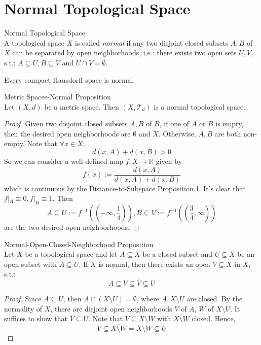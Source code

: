 \section{Normal Topological Space}

\begin{definition}{Normal Topological Space}\\
A topological space $X$ is called \textit{normal} if any two disjoint closed subsets $A,B$ of $X$ can be separated by open neighborhoods, i.e.: there exists two open sets $U,V$, s.t.: $A \subseteq U, B \subseteq V$ and $U \cap V =\emptyset$.
\end{definition}

\begin{proposition}
    Every compact Hausdorff space is normal.
\end{proposition}

\begin{proposition}{Metric Spaces-Normal Proposition}\\
Let $(X,d)$ be a metric space. Then $(X,\mathcal{T}_{d})$ is a normal topological space.
\end{proposition}

\begin{proof}
    Given two disjoint closed subsets $A,B$ of $B$, if one of $A$ or $B$ is empty, then the desired open neighborhoods are $\emptyset$ and $X$. Otherwise, $A,B$ are both non-empty. Note that $\forall x \in X$,
    $$d(x,A)+ d(x,B) >0$$
    So we can consider a well-defined map $f:X \to \mathbb{R}$ given by
    $$f(x) := \frac{d(x,A)}{d(x,A) + d(x,B)}$$
    which is continuous by the Distance-to-Subspace Proposition.1. It's clear that $f|_A \equiv 0, f|_B \equiv 1$. Then
    $$A \subseteq U:= f^{-1}((-\infty, \frac{1}{4})), B\subseteq V:= f^{-1}((\frac{3}{4}, \infty))$$
    are the two desired open neighborhoods.
\end{proof}

\begin{proposition}{Normal-Open-Closed-Neighborhood Proposition}\\
Let $X$ be a topological space and let $A \subseteq X$ be a closed subset and $U \subseteq X$ be an open subset with $A \subseteq U$. If $X$ is normal, then there exists an open $V \subseteq X$ in $X$, s.t.:
$$A \subseteq V \subseteq \overline{V} \subseteq U$$
\end{proposition}

\begin{proof}
    Since $A \subseteq U$, then $A \cap (X \setminus U)= \emptyset$, where $A,X\setminus U$ are closed. By the normality of $X$, there are disjoint open neighborhoods $V$ of $A$, $W$ of $X\setminus U$. It suffices to show that $\overline{V} \subseteq U$. Note that $V \subseteq X \setminus W$ with $X \setminus W$ closed. Hence,
    $$\overline{V} \subseteq \overline{X \setminus W} = X \setminus W\subseteq U$$
\end{proof}

